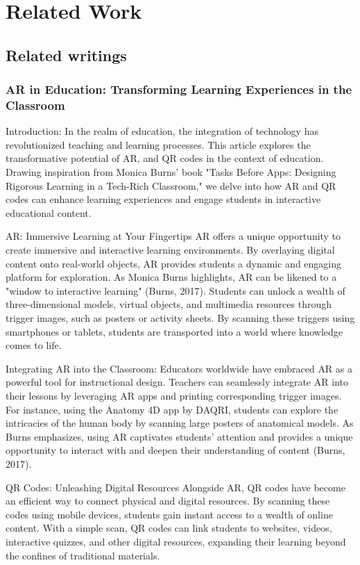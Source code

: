 \chapter{Related Work}\label{cap:relatedwork}
\section{Related writings}
\subsection*{\ac{AR} in Education: Transforming Learning Experiences in the Classroom}

Introduction: In the realm of education, the integration of technology has revolutionized teaching and learning processes. This article explores the transformative potential of \ac{AR}, and \ac{QR} codes in the context of education. Drawing inspiration from Monica Burns' book "Tasks Before Apps: Designing Rigorous Learning in a Tech-Rich Classroom," we delve into how \ac{AR} and \ac{QR} codes can enhance learning experiences and engage students in interactive educational content.

\ac{AR}: Immersive Learning at Your Fingertips \ac{AR} offers a unique opportunity to create immersive and interactive learning environments. By overlaying digital content onto real-world objects, \ac{AR} provides students a dynamic and engaging platform for exploration. As Monica Burns highlights, \ac{AR} can be likened to a "window to interactive learning" (Burns, 2017). Students can unlock a wealth of three-dimensional models, virtual objects, and multimedia resources through trigger images, such as posters or activity sheets. By scanning these triggers using smartphones or tablets, students are transported into a world where knowledge comes to life.

Integrating \ac{AR} into the Classroom: Educators worldwide have embraced \ac{AR} as a powerful tool for instructional design. Teachers can seamlessly integrate \ac{AR} into their lessons by leveraging \ac{AR} apps and printing corresponding trigger images. For instance, using the Anatomy 4D app by DAQRI, students can explore the intricacies of the human body by scanning large posters of anatomical models. As Burns emphasizes, using \ac{AR} captivates students' attention and provides a unique opportunity to interact with and deepen their understanding of content (Burns, 2017).

\ac{QR} Codes: Unleashing Digital Resources Alongside AR, \ac{QR} codes have become an efficient way to connect physical and digital resources. By scanning these codes using mobile devices, students gain instant access to a wealth of online content. With a simple scan, \ac{QR} codes can link students to websites, videos, interactive quizzes, and other digital resources, expanding their learning beyond the confines of traditional materials.

